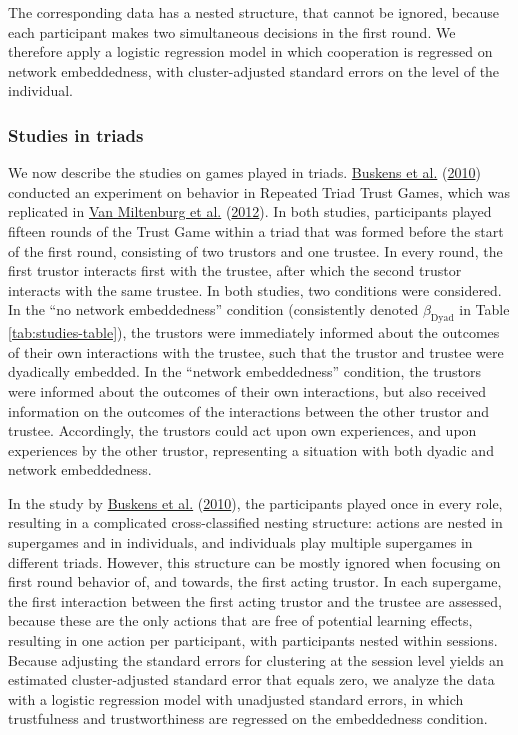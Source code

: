 \documentclass[
  11pt,
]{article}
\begin{document}
The corresponding data has a nested structure, that cannot be ignored, because each participant makes two simultaneous decisions in the first round.
We therefore apply a logistic regression model in which cooperation is regressed on network embeddedness, with cluster-adjusted standard errors on the level of the individual.

\hypertarget{studies-in-triads}{%
\subsubsection{Studies in triads}\label{studies-in-triads}}

We now describe the studies on games played in triads.
\protect\hyperlink{ref-buskens_raub_veer_triads_2010}{Buskens et al.} (\protect\hyperlink{ref-buskens_raub_veer_triads_2010}{2010}) conducted an experiment on behavior in Repeated Triad Trust Games, which was replicated in \protect\hyperlink{ref-miltenburg_buskens_triads_2012}{Van Miltenburg et al.} (\protect\hyperlink{ref-miltenburg_buskens_triads_2012}{2012}).
In both studies, participants played fifteen rounds of the Trust Game within a triad that was formed before the start of the first round, consisting of two trustors and one trustee.
In every round, the first trustor interacts first with the trustee, after which the second trustor interacts with the same trustee.
In both studies, two conditions were considered.
In the ``no network embeddedness'' condition (consistently denoted \(\beta_{\text{Dyad}}\) in Table \ref{tab:studies-table}), the trustors were immediately informed about the outcomes of their own interactions with the trustee, such that the trustor and trustee were dyadically embedded.
In the ``network embeddedness'' condition, the trustors were informed about the outcomes of their own interactions, but also received information on the outcomes of the interactions between the other trustor and trustee.
Accordingly, the trustors could act upon own experiences, and upon experiences by the other trustor, representing a situation with both dyadic and network embeddedness.

In the study by \protect\hyperlink{ref-buskens_raub_veer_triads_2010}{Buskens et al.} (\protect\hyperlink{ref-buskens_raub_veer_triads_2010}{2010}), the participants played once in every role, resulting in a complicated cross-classified nesting structure: actions are nested in supergames and in individuals, and individuals play multiple supergames in different triads.
However, this structure can be mostly ignored when focusing on first round behavior of, and towards, the first acting trustor.
In each supergame, the first interaction between the first acting trustor and the trustee are assessed, because these are the only actions that are free of potential learning effects, resulting in one action per participant, with participants nested within sessions.
Because adjusting the standard errors for clustering at the session level yields an estimated cluster-adjusted standard error that equals zero, we analyze the data with a logistic regression model with unadjusted standard errors, in which trustfulness and trustworthiness are regressed on the embeddedness condition.
\end{document}
